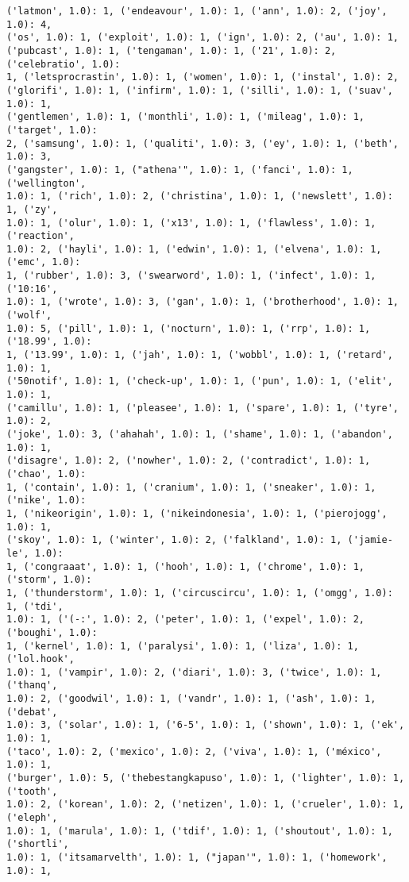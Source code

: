 \documentclass[11pt]{article}
\begin{document}
\begin{Verbatim}[commandchars=\\\{\}]
('latmon', 1.0): 1, ('endeavour', 1.0): 1, ('ann', 1.0): 2, ('joy', 1.0): 4,
('os', 1.0): 1, ('exploit', 1.0): 1, ('ign', 1.0): 2, ('au', 1.0): 1,
('pubcast', 1.0): 1, ('tengaman', 1.0): 1, ('21', 1.0): 2, ('celebratio', 1.0):
1, ('letsprocrastin', 1.0): 1, ('women', 1.0): 1, ('instal', 1.0): 2,
('glorifi', 1.0): 1, ('infirm', 1.0): 1, ('silli', 1.0): 1, ('suav', 1.0): 1,
('gentlemen', 1.0): 1, ('monthli', 1.0): 1, ('mileag', 1.0): 1, ('target', 1.0):
2, ('samsung', 1.0): 1, ('qualiti', 1.0): 3, ('ey', 1.0): 1, ('beth', 1.0): 3,
('gangster', 1.0): 1, ("athena'", 1.0): 1, ('fanci', 1.0): 1, ('wellington',
1.0): 1, ('rich', 1.0): 2, ('christina', 1.0): 1, ('newslett', 1.0): 1, ('zy',
1.0): 1, ('olur', 1.0): 1, ('x13', 1.0): 1, ('flawless', 1.0): 1, ('reaction',
1.0): 2, ('hayli', 1.0): 1, ('edwin', 1.0): 1, ('elvena', 1.0): 1, ('emc', 1.0):
1, ('rubber', 1.0): 3, ('swearword', 1.0): 1, ('infect', 1.0): 1, ('10:16',
1.0): 1, ('wrote', 1.0): 3, ('gan', 1.0): 1, ('brotherhood', 1.0): 1, ('wolf',
1.0): 5, ('pill', 1.0): 1, ('nocturn', 1.0): 1, ('rrp', 1.0): 1, ('18.99', 1.0):
1, ('13.99', 1.0): 1, ('jah', 1.0): 1, ('wobbl', 1.0): 1, ('retard', 1.0): 1,
('50notif', 1.0): 1, ('check-up', 1.0): 1, ('pun', 1.0): 1, ('elit', 1.0): 1,
('camillu', 1.0): 1, ('pleasee', 1.0): 1, ('spare', 1.0): 1, ('tyre', 1.0): 2,
('joke', 1.0): 3, ('ahahah', 1.0): 1, ('shame', 1.0): 1, ('abandon', 1.0): 1,
('disagre', 1.0): 2, ('nowher', 1.0): 2, ('contradict', 1.0): 1, ('chao', 1.0):
1, ('contain', 1.0): 1, ('cranium', 1.0): 1, ('sneaker', 1.0): 1, ('nike', 1.0):
1, ('nikeorigin', 1.0): 1, ('nikeindonesia', 1.0): 1, ('pierojogg', 1.0): 1,
('skoy', 1.0): 1, ('winter', 1.0): 2, ('falkland', 1.0): 1, ('jamie-le', 1.0):
1, ('congraaat', 1.0): 1, ('hooh', 1.0): 1, ('chrome', 1.0): 1, ('storm', 1.0):
1, ('thunderstorm', 1.0): 1, ('circuscircu', 1.0): 1, ('omgg', 1.0): 1, ('tdi',
1.0): 1, ('(-:', 1.0): 2, ('peter', 1.0): 1, ('expel', 1.0): 2, ('boughi', 1.0):
1, ('kernel', 1.0): 1, ('paralysi', 1.0): 1, ('liza', 1.0): 1, ('lol.hook',
1.0): 1, ('vampir', 1.0): 2, ('diari', 1.0): 3, ('twice', 1.0): 1, ('thanq',
1.0): 2, ('goodwil', 1.0): 1, ('vandr', 1.0): 1, ('ash', 1.0): 1, ('debat',
1.0): 3, ('solar', 1.0): 1, ('6-5', 1.0): 1, ('shown', 1.0): 1, ('ek', 1.0): 1,
('taco', 1.0): 2, ('mexico', 1.0): 2, ('viva', 1.0): 1, ('méxico', 1.0): 1,
('burger', 1.0): 5, ('thebestangkapuso', 1.0): 1, ('lighter', 1.0): 1, ('tooth',
1.0): 2, ('korean', 1.0): 2, ('netizen', 1.0): 1, ('crueler', 1.0): 1, ('eleph',
1.0): 1, ('marula', 1.0): 1, ('tdif', 1.0): 1, ('shoutout', 1.0): 1, ('shortli',
1.0): 1, ('itsamarvelth', 1.0): 1, ("japan'", 1.0): 1, ('homework', 1.0): 1,

\end{Verbatim}
\end{document}
